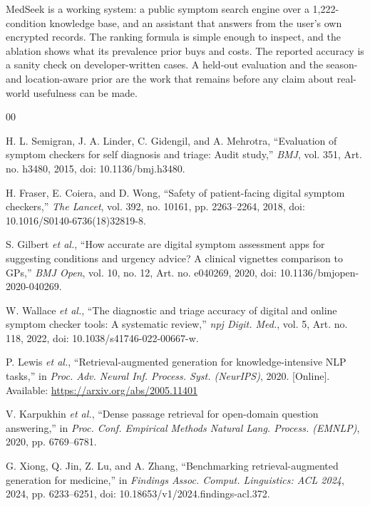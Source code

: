 \documentclass[conference]{IEEEtran}
\begin{document}
MedSeek is a working system: a public symptom search engine over a 1,222-condition knowledge base, and an assistant that answers from the user's own encrypted records. The ranking formula is simple enough to inspect, and the ablation shows what its prevalence prior buys and costs. The reported accuracy is a sanity check on developer-written cases. A held-out evaluation and the season- and location-aware prior are the work that remains before any claim about real-world usefulness can be made.

\begin{thebibliography}{00}

 H. L. Semigran, J. A. Linder, C. Gidengil, and A. Mehrotra, ``Evaluation of symptom checkers for self diagnosis and triage: Audit study,'' \textit{BMJ}, vol. 351, Art. no. h3480, 2015, doi: 10.1136/bmj.h3480.

 H. Fraser, E. Coiera, and D. Wong, ``Safety of patient-facing digital symptom checkers,'' \textit{The Lancet}, vol. 392, no. 10161, pp. 2263--2264, 2018, doi: 10.1016/S0140-6736(18)32819-8.

 S. Gilbert \textit{et al.}, ``How accurate are digital symptom assessment apps for suggesting conditions and urgency advice? A clinical vignettes comparison to GPs,'' \textit{BMJ Open}, vol. 10, no. 12, Art. no. e040269, 2020, doi: 10.1136/bmjopen-2020-040269.

 W. Wallace \textit{et al.}, ``The diagnostic and triage accuracy of digital and online symptom checker tools: A systematic review,'' \textit{npj Digit. Med.}, vol. 5, Art. no. 118, 2022, doi: 10.1038/s41746-022-00667-w.

 P. Lewis \textit{et al.}, ``Retrieval-augmented generation for knowledge-intensive NLP tasks,'' in \textit{Proc. Adv. Neural Inf. Process. Syst. (NeurIPS)}, 2020. [Online]. Available: \url{https://arxiv.org/abs/2005.11401}

 V. Karpukhin \textit{et al.}, ``Dense passage retrieval for open-domain question answering,'' in \textit{Proc. Conf. Empirical Methods Natural Lang. Process. (EMNLP)}, 2020, pp. 6769--6781.

 G. Xiong, Q. Jin, Z. Lu, and A. Zhang, ``Benchmarking retrieval-augmented generation for medicine,'' in \textit{Findings Assoc. Comput. Linguistics: ACL 2024}, 2024, pp. 6233--6251, doi: 10.18653/v1/2024.findings-acl.372.


\end{thebibliography}
\end{document}
